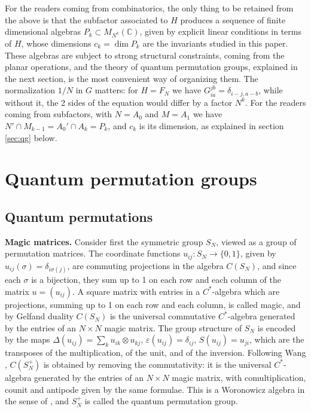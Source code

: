 \documentclass[11pt]{amsart}
\begin{document}
For the readers coming from combinatorics, the only thing to be retained from the above is that the subfactor associated to $H$ produces a sequence of finite dimensional algebras $P_k\subset M_{N^k}(\mathbb C)$, given by explicit linear conditions in terms of $H$, whose dimensions $c_k=\dim P_k$ are the invariants studied in this paper. These algebras are subject to strong structural constraints, coming from the planar operations, and the theory of quantum permutation groups, explained in the next section, is the most convenient way of organizing them. The normalization $1/N$ in $G$ matters: for $H=F_N$ we have $G_{ia}^{jb}=\delta_{i-j,a-b}$, while without it, the 2 sides of the equation would differ by a factor $N^k$. For the readers coming from subfactors, with $N=A_0$ and $M=A_1$ we have $N'\cap M_{k-1}=A_0'\cap A_k=P_k$, and $c_k$ is its dimension, as explained in section \ref{sec:qg} below.

\section{Quantum permutation groups}

\subsection{Quantum permutations}\label{sec:qperm}

\noindent\textbf{Magic matrices.} Consider first the symmetric group $S_N$, viewed as a group of permutation matrices. The coordinate functions $u_{ij}:S_N\to\{0,1\}$, given by $u_{ij}(\sigma)=\delta_{i\sigma(j)}$, are commuting projections in the algebra $C(S_N)$, and since each $\sigma$ is a bijection, they sum up to 1 on each row and each column of the matrix $u=(u_{ij})$. A square matrix with entries in a $C^*$-algebra which are projections, summing up to 1 on each row and each column, is called magic, and by Gelfand duality $C(S_N)$ is the universal commutative $C^*$-algebra generated by the entries of an $N\times N$ magic matrix. The group structure of $S_N$ is encoded by the maps $\Delta(u_{ij})=\sum_ku_{ik}\otimes u_{kj}$, $\varepsilon(u_{ij})=\delta_{ij}$, $S(u_{ij})=u_{ji}$, which are the transposes of the multiplication, of the unit, and of the inversion. Following Wang \cite{wa1}, $C(S_N^+)$ is obtained by removing the commutativity: it is the universal $C^*$-algebra generated by the entries of an $N\times N$ magic matrix, with comultiplication, counit and antipode given by the same formulae. This is a Woronowicz algebra in the sense of \cite{wo1}, and $S_N^+$ is called the quantum permutation group.
\end{document}
